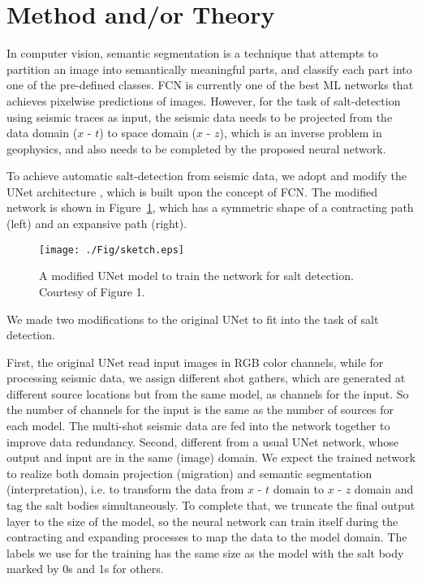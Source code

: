 \documentclass{cph18}
\begin{document}
\section{Method and/or Theory}
In computer vision, semantic segmentation is a technique that attempts to partition an image into semantically meaningful parts, and classify each part into one of the pre-defined classes. FCN is currently one of the best ML networks that achieves pixelwise predictions of images. However, for the task of salt-detection using seismic traces as input, the seismic data needs to be projected from the data domain ($x$ - $t$) to space domain ($x$ - $z$), which is an inverse problem in geophysics, and also needs to be completed by the proposed neural network.

To achieve automatic salt-detection from seismic data, we adopt and modify the UNet architecture \citep{ronneberger15}, which is built upon the concept of FCN. The modified network is shown in Figure~\ref{fig:sketch2}, which has a symmetric shape of a contracting path (left) and an expansive path (right).
\begin{figure}[!htb]
  \centering
  \texttt{[image: ./Fig/sketch.eps]}
  \caption{A modified UNet model to train the network for salt detection. Courtesy of \citet{ronneberger15} Figure 1.}
\label{fig:sketch2}
\end{figure}
We made two modifications to the original UNet to fit into the task of salt detection. 

First, the original UNet read input images in RGB color channels, while for processing seismic data, we assign different shot gathers, which are generated at different source locations but from the same model, as channels for the input. So the number of channels for the input is the same as the number of sources for each model. The multi-shot seismic data are fed into the network together to improve data redundancy. Second, different from a usual UNet network, whose output and input are in the same (image) domain. We expect the trained network to realize both domain projection (migration) and semantic segmentation (interpretation), i.e. to transform the data from $x$ - $t$ domain to $x$ - $z$ domain and tag the salt bodies simultaneously. To complete that, we truncate the final output layer to the size of the model, so the neural network can train itself during the contracting and expanding processes to map the data to the model domain.
The labels we use for the training has the same size as the model with the salt body marked by 0s and 1s for others.
\end{document}
